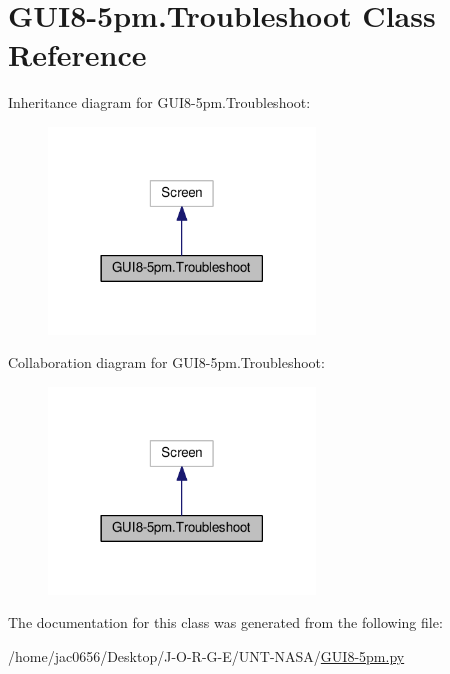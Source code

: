 \hypertarget{classGUI8-5pm_1_1Troubleshoot}{}\section{G\+U\+I8-\/5pm.Troubleshoot Class Reference}
\label{classGUI8-5pm_1_1Troubleshoot}


Inheritance diagram for G\+U\+I8-\/5pm.Troubleshoot\+:\nopagebreak
\begin{figure}[H]
\begin{center}
\leavevmode
\includegraphics[width=201pt]{classGUI8-5pm_1_1Troubleshoot__inherit__graph}
\end{center}
\end{figure}


Collaboration diagram for G\+U\+I8-\/5pm.Troubleshoot\+:\nopagebreak
\begin{figure}[H]
\begin{center}
\leavevmode
\includegraphics[width=201pt]{classGUI8-5pm_1_1Troubleshoot__coll__graph}
\end{center}
\end{figure}


The documentation for this class was generated from the following file\+:\begin{DoxyCompactItemize}
\item 
/home/jac0656/\+Desktop/\+J-\/\+O-\/\+R-\/\+G-\/\+E/\+U\+N\+T-\/\+N\+A\+S\+A/\hyperlink{GUI8-5pm_8py}{G\+U\+I8-\/5pm.\+py}\end{DoxyCompactItemize}

